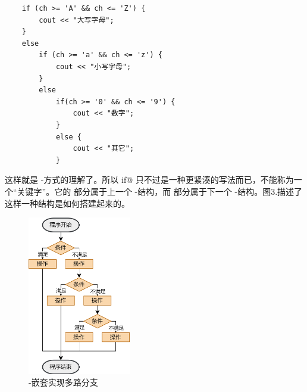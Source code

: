 \begin{lstlisting}
    if (ch >= 'A' && ch <= 'Z') {
        cout << "大写字母";
    }
    else
        if (ch >= 'a' && ch <= 'z') {
            cout << "小写字母";
        }
        else
            if(ch >= '0' && ch <= '9') {
                cout << "数字";
            }
            else {
                cout << "其它";
            }
\end{lstlisting}
这样就是 \lstinline@if@-\lstinline@else@ 方式的理解了。所以 \lstinline@else if@ 只不过是一种更紧湊的写法而已，不能称为一个``关键字''。它的 \lstinline@else@ 部分属于上一个 \lstinline@if@-\lstinline@else@ 结构，而 \lstinline@if@ 部分属于下一个 \lstinline@if@-\lstinline@else@ 结构。图3.描述了这样一种结构是如何搭建起来的。\par
\begin{figure}[htbp]
    \centering
    \includegraphics[width=0.4\textwidth]{../images/generalized_parts/03_if_elseif_else.drawio.png}
    \caption{\lstinline@if@-\lstinline@else@ 嵌套实现多路分支}
\end{figure}
